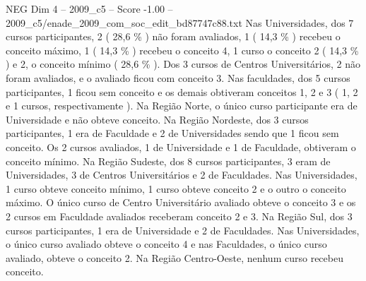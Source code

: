 \begin{textsample}{NEG Dim 4 – 2009\_c5 – Score -1.00 – 2009\_c5/enade\_2009\_com\_soc\_edit\_bd87747c88.txt}
Nas Universidades, dos 7 cursos participantes, 2 ( 28,6 \% ) não foram avaliados, 1 ( 14,3 \% ) recebeu o conceito máximo, 1 ( 14,3 \% ) recebeu o conceito 4, 1 curso o conceito 2 ( 14,3 \% ) e 2, o conceito mínimo ( 28,6 \% ).
Dos 3 cursos de Centros Universitários, 2 não foram avaliados, e o avaliado ficou com conceito 3.
Nas faculdades, dos 5 cursos participantes, 1 ficou sem conceito e os demais obtiveram conceitos 1, 2 e 3 ( 1, 2 e 1 cursos, respectivamente ).
Na Região Norte, o único curso participante era de Universidade e não obteve conceito.
Na Região Nordeste, dos 3 cursos participantes, 1 era de Faculdade e 2 de Universidades sendo que 1 ficou sem conceito.
Os 2 cursos avaliados, 1 de Universidade e 1 de Faculdade, obtiveram o conceito mínimo.
Na Região Sudeste, dos 8 cursos participantes, 3 eram de Universidades, 3 de Centros Universitários e 2 de Faculdades.
Nas Universidades, 1 curso obteve conceito mínimo, 1 curso obteve conceito 2 e o outro o conceito máximo.
O único curso de Centro Universitário avaliado obteve o conceito 3 e os 2 cursos em Faculdade avaliados receberam conceito 2 e 3.
Na Região Sul, dos 3 cursos participantes, 1 era de Universidade e 2 de Faculdades.
Nas Universidades, o único curso avaliado obteve o conceito 4 e nas Faculdades, o único curso avaliado, obteve o conceito 2.
Na Região Centro-Oeste, nenhum curso recebeu conceito.

\end{textsample}
